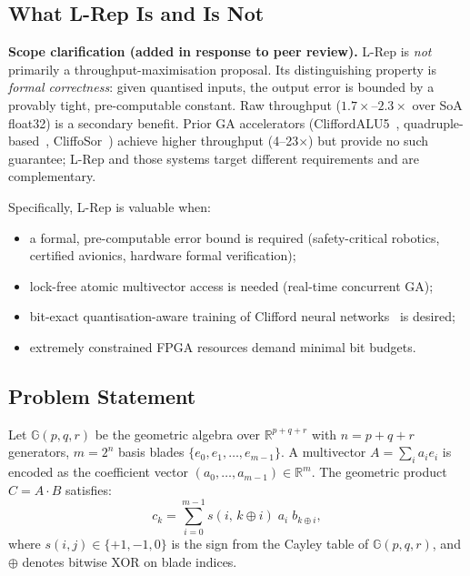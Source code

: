 \documentclass[11pt,a4paper]{article}
\theoremstyle{definition}
\theoremstyle{plain}
\theoremstyle{remark}
\newcommand{\GA}{\mathbb{G}}
\newcommand{\reals}{\mathbb{R}}
\begin{document}
\subsection{What L-Rep Is and Is Not}

\begin{warningbox}
\textbf{Scope clarification (added in response to peer review).}
L-Rep is \emph{not} primarily a throughput-maximisation proposal.
Its distinguishing property is \emph{formal correctness}: given
quantised inputs, the output error is bounded by a provably tight,
pre-computable constant.
Raw throughput ($1.7\times$--$2.3\times$ over SoA float32) is a secondary
benefit.
Prior GA accelerators (CliffordALU5~\cite{cliffordalu5},
quadruple-based~\cite{quadrupleGA}, CliffoSor~\cite{cliffosor})
achieve higher throughput (4--23$\times$) but provide no such guarantee;
L-Rep and those systems target different requirements and are complementary.
\end{warningbox}

Specifically, L-Rep is valuable when:
\begin{itemize}
  \item a formal, pre-computable error bound is required (safety-critical robotics,
        certified avionics, hardware formal verification);
  \item lock-free atomic multivector access is needed (real-time concurrent GA);
  \item bit-exact quantisation-aware training of Clifford neural
        networks~\cite{brandstetter2023} is desired;
  \item extremely constrained FPGA resources demand minimal bit budgets.
\end{itemize}

\subsection{Problem Statement}

Let $\GA(p,q,r)$ be the geometric algebra over $\reals^{p+q+r}$ with
$n = p+q+r$ generators, $m = 2^n$ basis blades
$\{e_0, e_1, \ldots, e_{m-1}\}$.
A multivector $A = \sum_i a_i e_i$ is encoded as the coefficient
vector $(a_0, \ldots, a_{m-1}) \in \reals^m$.
The geometric product $C = A \cdot B$ satisfies:
\begin{equation}\label{eq:gaprod}
  c_k = \sum_{i=0}^{m-1} s(i,\, k\oplus i)\;\! a_i\;\! b_{k\oplus i},
\end{equation}
where $s(i,j) \in \{+1, -1, 0\}$ is the sign from the Cayley table
of $\GA(p,q,r)$, and $\oplus$ denotes bitwise XOR on blade indices.
\end{document}
